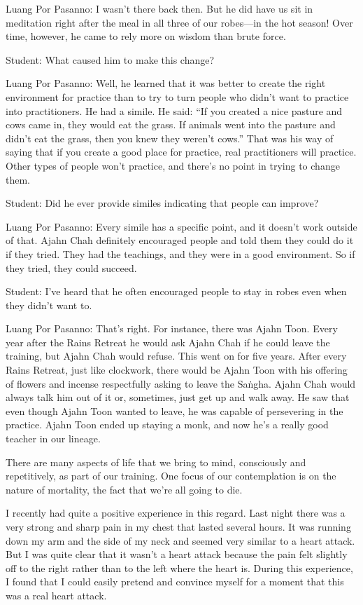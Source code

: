 Luang Por Pasanno: I wasn't there back then. But he did have us sit in 
meditation right after the meal in all three of our robes---in the hot 
season! Over time, however, he came to rely more on wisdom than brute 
force.

Student: What caused him to make this change?

Luang Por Pasanno: Well, he learned that it was better to create the 
right environment for practice than to try to turn people who didn't 
want to practice into practitioners. He had a simile. He said: ``If you 
created a nice pasture and cows came in, they would eat the grass. If 
animals went into the pasture and didn't eat the grass, then you knew 
they weren't cows.'' That was his way of saying that if you create a 
good place for practice, real practitioners will practice. Other types 
of people won't practice, and there's no point in trying to change them.

Student: Did he ever provide similes indicating that people can improve?

Luang Por Pasanno: Every simile has a specific point, and it doesn't 
work outside of that. Ajahn Chah definitely encouraged people and told 
them they could do it if they tried. They had the teachings, and they 
were in a good environment. So if they tried, they could succeed.

Student: I've heard that he often encouraged people to stay in robes 
even when they didn't want to.

Luang Por Pasanno: That's right. For instance, there was Ajahn Toon. 
Every year after the Rains Retreat he would ask Ajahn Chah if he could 
leave the training, but Ajahn Chah would refuse. This went on for five 
years. After every Rains Retreat, just like clockwork, there would be 
Ajahn Toon with his offering of flowers and incense respectfully asking 
to leave the Saṅgha. Ajahn Chah would always talk him out of it or, 
sometimes, just get up and walk away. He saw that even though Ajahn 
Toon wanted to leave, he was capable of persevering in the practice. 
Ajahn Toon ended up staying a monk, and now he's a really good teacher 
in our lineage.


There are many aspects of life that we bring to mind, consciously and 
repetitively, as part of our training. One focus of our contemplation 
is on the nature of mortality, the fact that we're all going to die.

I recently had quite a positive experience in this regard. Last night 
there was a very strong and sharp pain in my chest that lasted several 
hours. It was running down my arm and the side of my neck and seemed 
very similar to a heart attack. But I was quite clear that it wasn't a 
heart attack because the pain felt slightly off to the right rather 
than to the left where the heart is. During this experience, I found 
that I could easily pretend and convince myself for a moment that this 
was a real heart attack.

